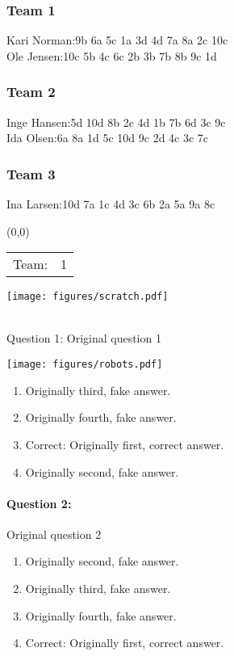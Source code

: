 \documentclass[9pt, twoside, twocolumn]{extarticle}
\renewcommand{\includegraphics}[2][]{\OldIncludegraphics[width=\linewidth, #1]{#2}}
\renewcommand{\caption}{}
\newcommand{\teamprefix}[2]{%
\begin{textblock}{3.5}(0,0)
\begin{tabular}{ll}
Team: & \huge\linespread{6} #1
\end{tabular}

\texttt{[image: figures/scratch.pdf]}

\end{textblock}
\textcolor{white}{.}\\ %
\vspace{10cm}
}%
\let\origfigure=\figure
\let\endorigfigure=\endfigure
\renewenvironment{figure}[1][]{%
  \origfigure[H]
}{%
  \endorigfigure
}
\begin{document}
\subsubsection*{Team 1}
Kari Norman:9b 6a 5c 1a 3d 4d 7a 8a 2c 10c\\
Ole Jensen:10c 5b 4c 6c 2b 3b 7b 8b 9c 1d\\
\subsubsection*{Team 2}
Inge Hansen:5d 10d 8b 2c 4d 1b 7b 6d 3c 9c\\
Ida Olsen:6a 8a 1d 5c 10d 9c 2d 4c 3c 7c\\
\subsubsection*{Team 3}
Ina Larsen:10d 7a 1c 4d 3c 6b 2a 5a 9a 8c\\
\cleardoublepage
\newpage

\teamprefix{1}

\paragraph{Question 1:}
Original question 1

\begin{figure}\centering
\texttt{[image: figures/robots.pdf]}
\caption{\end{figure}
\begin{enumerate}[label=\textbf{{\Alph*}},labelindent=0pt, labelsep=1.5em, parsep=0.2em]
\item Originally third, fake answer.
\item Originally fourth, fake answer.
\item Correct: Originally first, correct answer.
\item Originally second, fake answer.
\end{enumerate}
\paragraph{Question 2:}
Original question 2

\begin{enumerate}[label=\textbf{{\Alph*}},labelindent=0pt, labelsep=1.5em, parsep=0.2em]
\item Originally second, fake answer.
\item Originally third, fake answer.
\item Originally fourth, fake answer.
\item Correct: Originally first, correct answer.
\end{enumerate}
\end{document}
